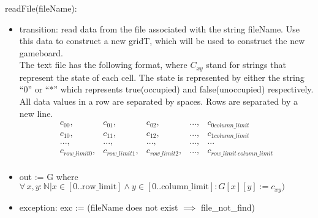 \documentclass[12pt]{article}
\begin{document}
\noindent readFile(fileName):
\begin{itemize}
\item transition: read data from the file associated with the string fileName.
  Use this data to construct a new gridT, which will be used to construct the new gameboard.\\

  The text file has the following format, where $C_{xy}$ stand for strings that
  represent the state of each cell. The state is
  represented by either the string ``0'' or ``*'' which represents true(occupied) and false(unoccupied) respectively. All data values in a row are separated by spaces.  Rows are
  separated by a new line.  
  \begin{equation}
    \begin{array}{ccccccc}
      c_{00}, & c_{01}, & c_{02}, &..., & c_{0column\_limit} \\
      c_{10}, & c_{11}, & c_{12}, &..., & c_{1column\_limit} \\
      ..., & ..., & ..., & ..., & ... \\
      c_{row\_limit0}, & c_{row\_limit1}, & c_{row\_limit2}, &..., & c_{row\_limit\ column\_limit} \\
    \end{array}
  \end{equation}

\item out := G where $\forall\, x, y: \mathbb{N} | x \in [0..\text{row\_limit}] \wedge y \in [0..\text{column\_limit}]:  G[x][y] :=  c_{xy})$ \\

\item exception: exc := (fileName does not exist $\implies$ file\_not\_find)

\end{itemize}
\end{document}

